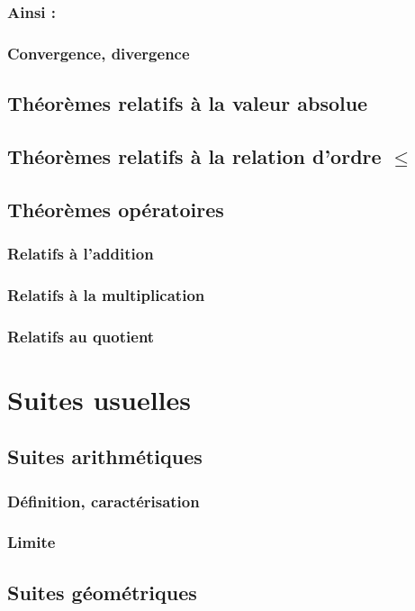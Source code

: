 \documentclass[12pt,a4paper,french]{book}
\begin{document}
			\subsubsection{Ainsi :}
			\subsubsection{Convergence, divergence}
		\subsection{Théorèmes relatifs à la valeur absolue}
		\subsection{Théorèmes relatifs à la relation d'ordre $\leqslant$}
		\subsection{Théorèmes opératoires}
			\subsubsection{Relatifs à l'addition}
			\subsubsection{Relatifs à la multiplication}
			\subsubsection{Relatifs au quotient}
	\section{Suites usuelles}
		\subsection{Suites arithmétiques}
			\subsubsection{Définition, caractérisation}
			\subsubsection{Limite}
		\subsection{Suites géométriques}
\end{document}
